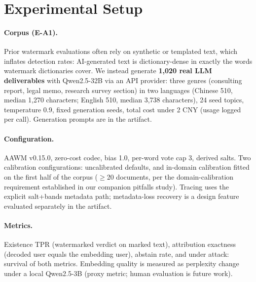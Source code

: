 \section{Experimental Setup}
\label{sec:setup}

\paragraph{Corpus (E-A1).}
Prior watermark evaluations often rely on synthetic or templated text,
which inflates detection rates: AI-generated text is dictionary-dense in
exactly the words watermark dictionaries cover. We instead generate
\textbf{1,020 real LLM deliverables} with Qwen2.5-32B via an API provider:
three genres (consulting report, legal memo, research survey section) in
two languages (Chinese 510, median 1,270 characters; English 510, median
3,738 characters), 24 seed topics, temperature 0.9, fixed generation seeds,
total cost under 2 CNY (usage logged per call). Generation prompts are in
the artifact.

\paragraph{Configuration.}
AAWM v0.15.0, zero-cost codec, bias 1.0, per-word vote cap 3, derived
salts. Two calibration configurations: uncalibrated defaults, and in-domain
calibration fitted on the first half of the corpus ($\ge$20 documents, per
the domain-calibration requirement established in our companion pitfalls
study). Tracing uses the explicit salt+bands metadata path; metadata-loss
recovery is a design feature evaluated separately in the artifact.

\paragraph{Metrics.}
Existence TPR (watermarked verdict on marked text), attribution exactness
(decoded user equals the embedding user), abstain rate, and under attack:
survival of both metrics. Embedding quality is measured as perplexity
change under a local Qwen2.5-3B (proxy metric; human evaluation is future
work).
